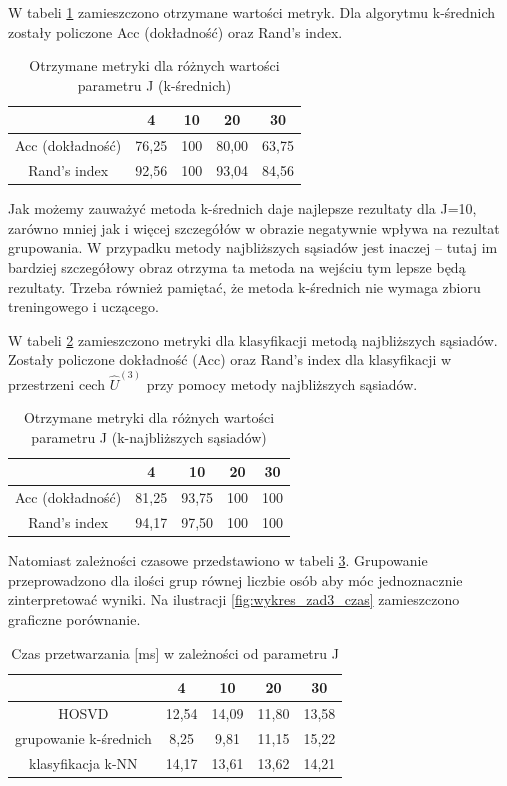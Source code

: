 \documentclass[11pt, a4paper]{article}
\newcommand{\fbi}{\leavevmode{\parindent=1em\indent}}
\begin{document}
\fbi
W tabeli \ref{tab:wynikiKmeans} zamieszczono otrzymane wartości metryk. Dla algorytmu k-średnich zostały policzone Acc (dokładność) oraz Rand's index.

\begin{table}[H]
	\centering
	\caption{Otrzymane metryki dla różnych wartości parametru J (k-średnich)}
	\begin{tabular}{|c|c|c|c|c|}
		\hline 
		 & 4 & 10 & 20 & 30 \\ 
		\hline
		Acc (dokładność) & 76,25 & 100 & 80,00 & 63,75 \\
		\hline
		Rand's index & 92,56 & 100 & 93,04 & 84,56 \\
		\hline
	\end{tabular}
	\label{tab:wynikiKmeans}
\end{table}

\fbi
Jak możemy zauważyć metoda k-średnich daje najlepsze rezultaty dla J=10, zarówno mniej jak i więcej szczegółów w obrazie negatywnie wpływa na rezultat grupowania. W przypadku metody najbliższych sąsiadów jest inaczej -- tutaj im bardziej szczegółowy obraz otrzyma ta metoda na wejściu tym lepsze będą rezultaty. Trzeba również pamiętać, że metoda k-średnich nie wymaga zbioru treningowego i uczącego.

W tabeli \ref{tab:wynikiKnn} zamieszczono metryki dla klasyfikacji metodą najbliższych sąsiadów. Zostały policzone dokładność (Acc) oraz Rand's index dla klasyfikacji w przestrzeni cech $\widehat{U}^{(3)}$ przy pomocy metody najbliższych sąsiadów.

\begin{table}[H]
	\centering
	\caption{Otrzymane metryki dla różnych wartości parametru J (k-najbliższych sąsiadów)}
	\begin{tabular}{|c|c|c|c|c|}
		\hline 
		& 4 & 10 & 20 & 30 \\ 
		\hline
		Acc (dokładność) & 81,25 & 93,75 & 100 & 100 \\
		\hline
		Rand's index & 94,17 & 97,50 & 100 & 100 \\
		\hline
	\end{tabular}
	\label{tab:wynikiKnn}
\end{table}

Natomiast zależności czasowe przedstawiono w tabeli \ref{tab:wynikiCzas}. Grupowanie przeprowadzono dla ilości grup równej liczbie osób aby móc jednoznacznie zinterpretować wyniki. Na ilustracji \ref{fig:wykres_zad3_czas} zamieszczono graficzne porównanie.

\begin{table}[H]
	\centering
	\caption{Czas przetwarzania [ms] w zależności od parametru J}
	\begin{tabular}{|c|c|c|c|c|}
		\hline 
		& 4 & 10 & 20 & 30 \\ 
		\hline
		HOSVD & 12,54 & 14,09 & 11,80 & 13,58 \\
		\hline
		grupowanie k-średnich & 8,25 & 9,81 & 11,15 & 15,22 \\
		\hline
		klasyfikacja k-NN & 14,17 & 13,61 & 13,62 & 14,21 \\
		\hline
	\end{tabular}
	\label{tab:wynikiCzas}
\end{table}
\end{document}
